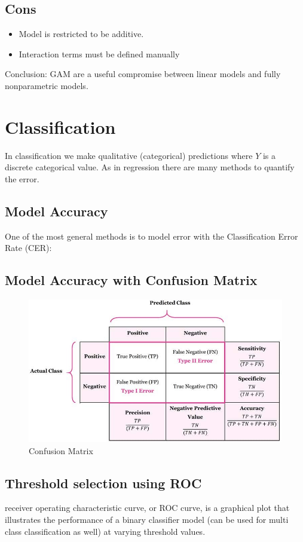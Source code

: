 \documentclass[../Main.tex]{subfiles}
\begin{document}
\subsection{Cons}
\begin{itemize}
    \item Model is restricted to be additive.
    \item Interaction terms must be defined manually
\end{itemize}
Conclusion: GAM are a useful compromise between linear models and fully nonparametric models.

\newpage
\section{Classification}
In classification we make qualitative (categorical) predictions where \(Y\) is a discrete categorical value.
As in regression there are many methods to quantify the error.

\subsection{Model Accuracy}
One of the most general methods is to model error with the Classification Error Rate (CER):

\subsection{Model Accuracy with Confusion Matrix}
\begin{figure}[H]
    \centering
    \includegraphics[width=0.75\linewidth]{Images/conf-matrix.jpg}
    \caption{Confusion Matrix}
\end{figure}

\subsection{Threshold selection using ROC}
receiver operating characteristic curve, or ROC curve,
is a graphical plot that illustrates the performance of a binary classifier model
(can be used for multi class classification as well) at varying threshold values.
\end{document}
